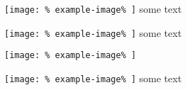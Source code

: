 \texttt{[image: \%
	example-image\%
]}
some text

\texttt{[image: \%
	example-image\%
]}%
some text

\texttt{[image: \%
	example-image\%
]} %

\texttt{[image: \%
	example-image\%
]}
some text
